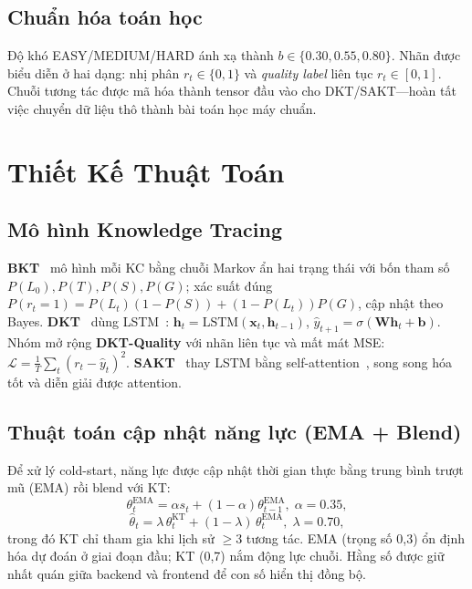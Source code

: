 \documentclass[11pt]{article}
\begin{document}
\subsection{Chuẩn hóa toán học}
Độ khó EASY/MEDIUM/HARD ánh xạ thành $b\in\{0.30,0.55,0.80\}$. Nhãn được biểu diễn ở hai dạng: nhị phân $r_t\in\{0,1\}$ và \textit{quality label} liên tục $r_t\in[0,1]$. Chuỗi tương tác được mã hóa thành tensor đầu vào cho DKT/SAKT---hoàn tất việc chuyển dữ liệu thô thành bài toán học máy chuẩn.

\section{Thiết Kế Thuật Toán}

\subsection{Mô hình Knowledge Tracing}
\textbf{BKT}~\cite{corbett1994knowledge} mô hình mỗi KC bằng chuỗi Markov ẩn hai trạng thái với bốn tham số $P(L_0),P(T),P(S),P(G)$; xác suất đúng $P(r_t{=}1)=P(L_t)(1{-}P(S))+(1{-}P(L_t))P(G)$, cập nhật theo Bayes. \textbf{DKT}~\cite{piech2015deep} dùng LSTM~\cite{hochreiter1997long}: $\mathbf{h}_t=\text{LSTM}(\mathbf{x}_t,\mathbf{h}_{t-1})$, $\hat{y}_{t+1}=\sigma(\mathbf{W}\mathbf{h}_t+\mathbf{b})$. Nhóm mở rộng \textbf{DKT-Quality} với nhãn liên tục và mất mát MSE: $\mathcal{L}=\frac{1}{T}\sum_t (r_t-\hat{y}_t)^2$. \textbf{SAKT}~\cite{pandey2019self} thay LSTM bằng self-attention~\cite{vaswani2017attention}, song song hóa tốt và diễn giải được attention.

\subsection{Thuật toán cập nhật năng lực (EMA + Blend)}
Để xử lý cold-start, năng lực được cập nhật thời gian thực bằng trung bình trượt mũ (EMA) rồi blend với KT:
\begin{equation}
\theta^{\text{EMA}}_t=\alpha s_t+(1-\alpha)\theta^{\text{EMA}}_{t-1},\;\alpha=0.35,
\end{equation}
\begin{equation}
\hat{\theta}_t=\lambda\,\theta^{\text{KT}}_t+(1-\lambda)\,\theta^{\text{EMA}}_t,\;\lambda=0.70,
\label{eq:blend}
\end{equation}
trong đó KT chỉ tham gia khi lịch sử $\geq3$ tương tác. EMA (trọng số 0,3) ổn định hóa dự đoán ở giai đoạn đầu; KT (0,7) nắm động lực chuỗi. Hằng số được giữ nhất quán giữa backend và frontend để con số hiển thị đồng bộ.
\end{document}
